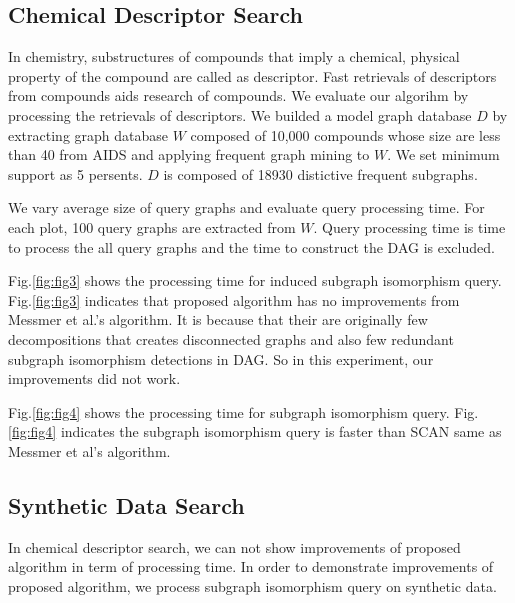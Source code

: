 \subsection{Chemical Descriptor Search}
In chemistry, substructures of compounds that imply a chemical, physical property of the compound are called as descriptor.
Fast retrievals of descriptors from compounds aids research of compounds.
We evaluate our algorihm by processing the retrievals of descriptors.
We builded a model graph database $D$ by extracting graph database $W$ composed of 10,000 compounds whose size are less than 40 from AIDS and applying frequent graph mining to $W$.
We set minimum support as 5 persents.
$D$ is composed of 18930 distictive frequent subgraphs.

We vary average size of query graphs and evaluate query processing time.
For each plot, 100 query graphs are extracted from $W$.
Query processing time is time to process the all query graphs and the time to construct the DAG is excluded.

Fig.\ref{fig:fig3} shows the processing time for induced subgraph isomorphism query.
Fig.\ref{fig:fig3} indicates that proposed algorithm has no improvements from Messmer et al.'s algorithm.
It is because that their are originally few decompositions that creates disconnected graphs and also few redundant subgraph isomorphism detections in DAG.
So in this experiment, our improvements did not work.

Fig.\ref{fig:fig4} shows the processing time for subgraph isomorphism query.
Fig.\ref{fig:fig4} indicates the subgraph isomorphism query is faster than SCAN same as Messmer et al's algorithm.

\subsection{Synthetic Data Search}
In chemical descriptor search, we can not show improvements of proposed algorithm in term of processing time.
In order to demonstrate improvements of proposed algorithm, we process subgraph isomorphism query on synthetic data.

